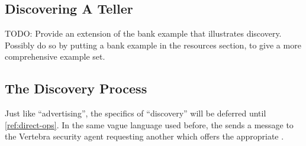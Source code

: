 \subsection{Discovering A Teller}

TODO: Provide an extension of the bank example that illustrates discovery.  Possibly do so by putting a bank example in the resources section, to give a more comprehensive example set.

\subsection{The Discovery Process}

Just like ``advertising'', the specifics of ``discovery'' will be deferred until \ref{ref:direct-ops}.  In the same vague language used before, the \agent{} sends a message to the Vertebra security agent requesting another \agent{} which offers the appropriate \resources{}.

